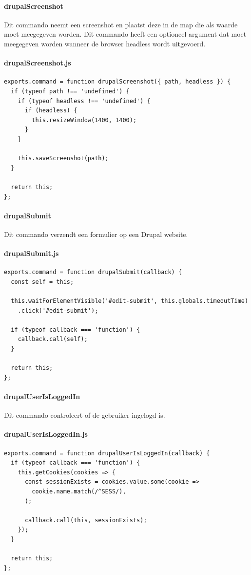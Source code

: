 \clearpage
\paragraph{drupalScreenshot}
\label{commando31}
Dit commando neemt een screenshot en plaatst deze in de map die als waarde moet meegegeven worden. Dit commando heeft een optioneel argument dat moet meegegeven worden wanneer de browser \gls{headless} wordt uitgevoerd.
\paragraph{drupalScreenshot.js}
\begin{lstlisting}[breaklines=true]
exports.command = function drupalScreenshot({ path, headless }) {
  if (typeof path !== 'undefined') {
    if (typeof headless !== 'undefined') {
      if (headless) {
        this.resizeWindow(1400, 1400);
      }
    }

    this.saveScreenshot(path);
  }

  return this;
};
\end{lstlisting}


\clearpage
\paragraph{drupalSubmit}
\label{commando32}
Dit commando verzendt een formulier op een Drupal website.
\paragraph{drupalSubmit.js}
\begin{lstlisting}[breaklines=true]
exports.command = function drupalSubmit(callback) {
  const self = this;

  this.waitForElementVisible('#edit-submit', this.globals.timeoutTime)
    .click('#edit-submit');

  if (typeof callback === 'function') {
    callback.call(self);
  }

  return this;
};
\end{lstlisting}


\clearpage
\paragraph{drupalUserIsLoggedIn}
\label{commando33}
Dit commando controleert of de gebruiker ingelogd is.
\paragraph{drupalUserIsLoggedIn.js}
\begin{lstlisting}[breaklines=true]
exports.command = function drupalUserIsLoggedIn(callback) {
  if (typeof callback === 'function') {
    this.getCookies(cookies => {
      const sessionExists = cookies.value.some(cookie =>
        cookie.name.match(/^SESS/),
      );

      callback.call(this, sessionExists);
    });
  }

  return this;
};
\end{lstlisting}








